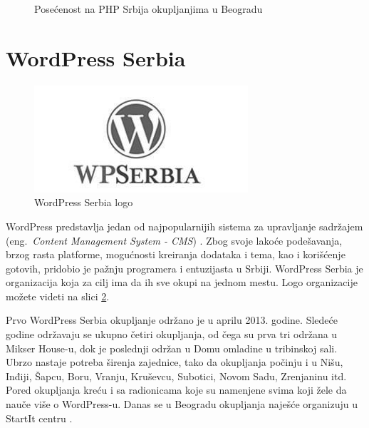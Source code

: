 \documentclass[a4paper]{article}
\begin{document}
{\begin{figure}
\caption{Posećenost na PHP Srbija okupljanjima u Beogradu}
\label{fig:PHPgrafik}
\end{figure}

\section{WordPress Serbia}
\begin{figure}[H]
\begin{center}
\includegraphics[scale=0.5]{wp.jpg}
\end{center}
\caption{WordPress Serbia logo}
\label{fig:wordpressLogo}
\end{figure}
WordPress predstavlja jedan od najpopularnijih sistema za upravljanje sadržajem (eng.~{\em Content Management System - CMS}) \cite{isitwp}. Zbog svoje lakoće podešavanja, brzog rasta platforme, mogućnosti kreiranja dodataka i tema, kao i korišćenje gotovih, pridobio je pažnju programera i entuzijasta u Srbiji. WordPress Serbia je organizacija koja za cilj ima da ih sve okupi na jednom mestu. Logo organizacije možete videti na slici \ref{fig:wordpressLogo}.

Prvo WordPress Serbia okupljanje održano je u aprilu 2013. godine. Sledeće godine održavaju se ukupno četiri okupljanja, od čega su prva tri održana u Mikser House-u, dok je poslednji održan u Domu omladine u tribinskoj sali. Ubrzo nastaje potreba širenja zajednice, tako da okupljanja počinju i u Nišu, Inđiji, Šapcu, Boru, Vranju, Kruševcu, Subotici, Novom Sadu, Zrenjaninu itd. Pored okupljanja kreću i sa radionicama koje su namenjene svima koji žele da nauče više o WordPress-u. Danas se u Beogradu okupljanja naješće organizuju u StartIt centru \cite{aboutStarit}.

}
\end{document}
